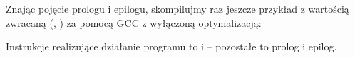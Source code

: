 
Znając pojęcie prologu i epilogu, skompilujmy raz jeszcze przykład z wartością zwracaną
(, ) za pomocą GCC z wyłączoną optymalizacją:



Instrukcje realizujące działanie programu to  i  -- pozostałe to prolog i epilog.

